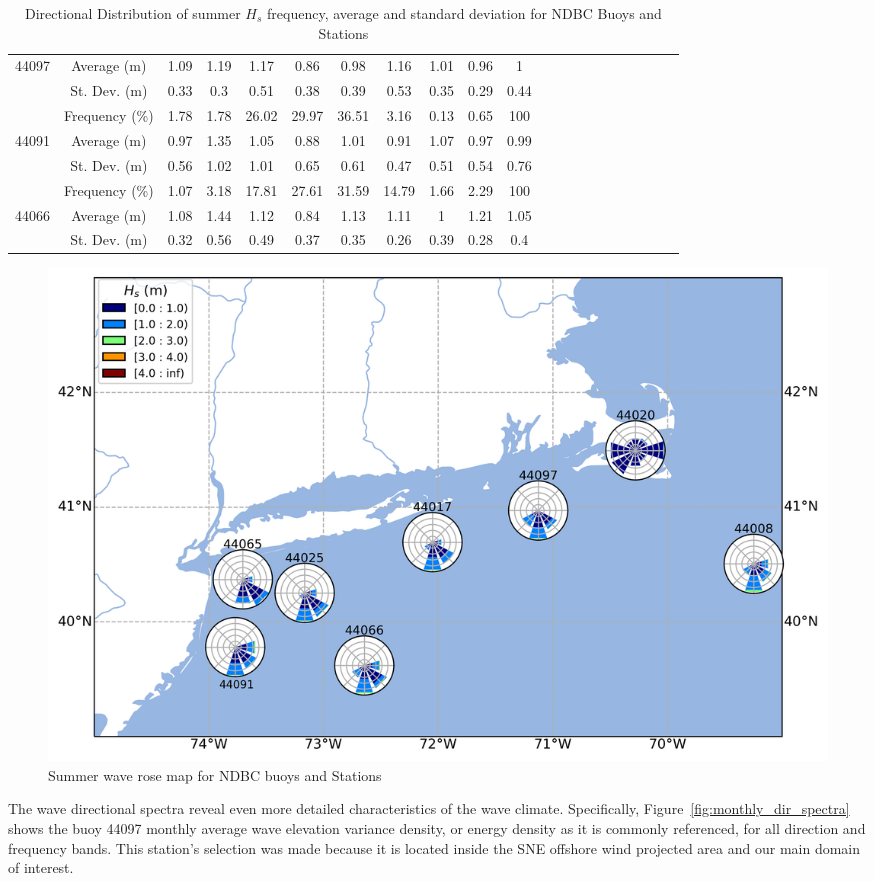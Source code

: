 \begin{table}[H]
\begin{tabular*}{\textwidth}{c@{\hskip 0.07in}cccccccccc @{\extracolsep{\fill}} cccccccccc}
    44097 & Average (m)   & 1.09 & 1.19 & 1.17  & 0.86  & 0.98  & 1.16  & 1.01  & 0.96 & 1    \\
    ~     & St. Dev. (m)  & 0.33 & 0.3  & 0.51  & 0.38  & 0.39  & 0.53  & 0.35  & 0.29 & 0.44 \\ \midrule
    ~     & Frequency (\%)  & 1.78 & 1.78 & 26.02 & 29.97 & 36.51 & 3.16  & 0.13  & 0.65 & 100  \\
    44091 & Average (m)   & 0.97 & 1.35 & 1.05  & 0.88  & 1.01  & 0.91  & 1.07  & 0.97 & 0.99 \\
    ~     & St. Dev. (m)  & 0.56 & 1.02 & 1.01  & 0.65  & 0.61  & 0.47  & 0.51  & 0.54 & 0.76 \\ \midrule
    ~     & Frequency (\%)  & 1.07 & 3.18 & 17.81 & 27.61 & 31.59 & 14.79 & 1.66  & 2.29 & 100  \\
    44066 & Average (m)   & 1.08 & 1.44 & 1.12  & 0.84  & 1.13  & 1.11  & 1     & 1.21 & 1.05 \\
    ~     & St. Dev. (m)  & 0.32 & 0.56 & 0.49  & 0.37  & 0.35  & 0.26  & 0.39  & 0.28 & 0.4  \\ \bottomrule
\end{tabular*}
\caption {Directional Distribution of summer $H_{s}$ frequency, average and standard deviation for NDBC Buoys and Stations}
\label{tab:wave_distribution_summer}
\end{table}


\begin{figure}[H]
\centering
\includegraphics[width=0.81\linewidth]{Figures/Chapter5/waverose_map_summer.png}
\caption{Summer wave rose map for NDBC buoys and Stations}
\label{fig:waverose_map_summer}
\end{figure}


 

The wave directional spectra reveal even more detailed characteristics of the wave climate. Specifically, Figure~\ref{fig:monthly_dir_spectra} shows the buoy 44097 monthly average wave elevation variance density, or energy density as it is commonly referenced, for all direction and frequency bands. This station's selection was made because it is located inside the SNE offshore wind projected area and our main domain of interest.



